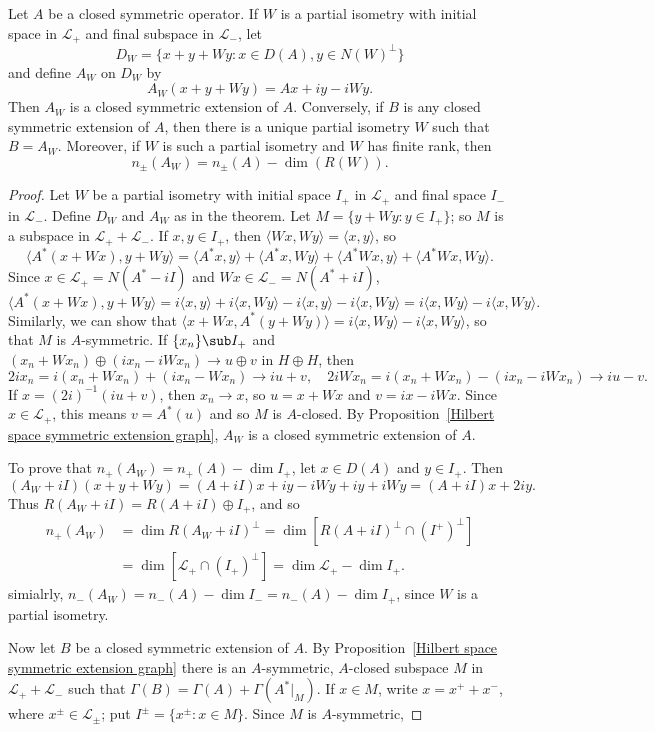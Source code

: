 \begin{theorem}
Let $A$ be a closed symmetric operator. If $W$ is a partial isometry with initial space in $\mathscr{L}_+$ and final subspace in $\mathscr{L}_-$, let
\[D_W=\{x+y+Wy:x\in D(A),y\in N(W)^\bot\}\]
and define $A_W$ on $D_W$ by
\[A_W(x+y+Wy)=Ax+iy-iWy.\]
Then $A_W$ is a closed symmetric extension of $A$. Conversely, if $B$ is any closed symmetric extension of $A$, then there is a unique partial isometry $W$ such that $B=A_W$. Moreover, if $W$ is such a partial isometry and $W$ has finite rank, then
\[n_\pm(A_W)=n_\pm(A)-\dim(R(W)).\]
\end{theorem}
\begin{proof}
Let $W$ be a partial isometry with initial space $I_+$ in $\mathscr{L}_+$ and final space $I_-$ in $\mathscr{L}_-$. Define $D_W$ and $A_W$ as in the theorem. Let $M=\{y+Wy:y\in I_+\}$; so $M$ is a subspace in $\mathscr{L}_++\mathscr{L}_-$. If $x,y\in I_+$, then $\langle Wx,Wy\rangle=\langle x,y\rangle$, so
\[\langle A^*(x+Wx),y+Wy\rangle=\langle A^*x,y\rangle+\langle A^*x,Wy\rangle+\langle A^*Wx,y\rangle+\langle A^*Wx,Wy\rangle.\]
Since $x\in\mathscr{L}_+=N(A^*-iI)$ and $Wx\in \mathscr{L}_-=N(A^*+iI)$,
\[\langle A^*(x+Wx),y+Wy\rangle=i\langle x,y\rangle+i\langle x,Wy\rangle-i\langle x,y\rangle-i\langle x,Wy\rangle=i\langle x,Wy\rangle-i\langle x,Wy\rangle.\]
Similarly, we can show that $\langle x+Wx,A^*(y+Wy)\rangle=i\langle x,Wy\rangle-i\langle x,Wy\rangle$, so that $M$ is $A$-symmetric. If $\{x_n\}\sub I_+$ and $(x_n+Wx_n)\oplus(ix_n-iWx_n)\to u\oplus v$ in $H\oplus H$, then
\[2ix_n=i(x_n+Wx_n)+(ix_n-Wx_n)\to iu+v,\quad 2iWx_n=i(x_n+Wx_n)-(ix_n-iWx_n)\to iu-v.\]
If $x=(2i)^{-1}(iu+v)$, then $x_n\to x$, so $u=x+Wx$ and $v=ix-iWx$. Since $x\in\mathscr{L}_+$, this means $v=A^*(u)$ and so $M$ is $A$-closed. By Proposition~\ref{Hilbert space symmetric extension graph}, $A_W$ is a closed symmetric extension of $A$.\par
To prove that $n_+(A_W)=n_+(A)-\dim I_+$, let $x\in D(A)$ and $y\in I_+$. Then
\[(A_W+iI)(x+y+Wy)=(A+iI)x+iy-iWy+iy+iWy=(A+iI)x+2iy.\]
Thus $R(A_W+iI)=R(A+iI)\oplus I_+$, and so
\begin{align*}
n_+(A_W)&=\dim R(A_W+iI)^\bot=\dim[R(A+iI)^\bot\cap(I^+)^\bot]\\
&=\dim[\mathscr{L}_+\cap(I_+)^\bot]=\dim\mathscr{L}_+-\dim I_+.
\end{align*}
simialrly, $n_-(A_W)=n_-(A)-\dim I_-=n_-(A)-\dim I_+$, since $W$ is a partial isometry.\par
Now let $B$ be a closed symmetric extension of $A$. By Proposition~\ref{Hilbert space symmetric extension graph} there is an $A$-symmetric, $A$-closed subspace $M$ in $\mathscr{L}_++\mathscr{L}_-$ such that $\Gamma(B)=\Gamma(A)+\Gamma(A^*|_M)$. If $x\in M$, write $x=x^++x^-$, where $x^\pm\in\mathscr{L}_\pm$; put $I^\pm=\{x^\pm:x\in M\}$. Since $M$ is $A$-symmetric,

\end{proof}
